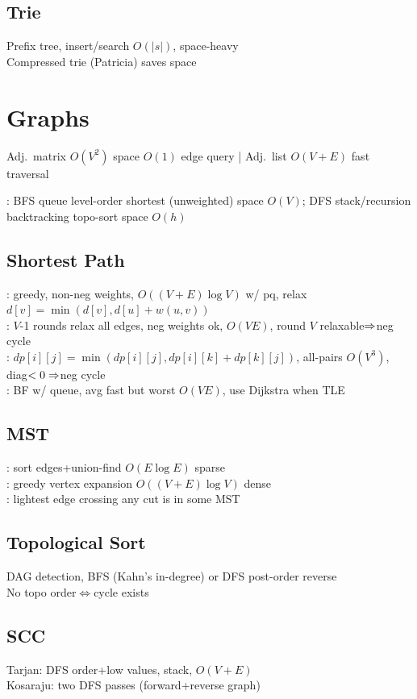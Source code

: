 \documentclass[lang=en,cols=5,paper=a4,fontsize=6pt,scheme=classic]{../cheatsheet}
\begin{document}
\subsection{Trie}
Prefix tree, insert/search $O(|s|)$, space-heavy\\
Compressed trie (Patricia) saves space

\section{Graphs}
Adj.\ matrix $O(V^2)$ space $O(1)$ edge query | Adj.\ list $O(V+E)$ fast traversal

: BFS queue level-order shortest (unweighted) space $O(V)$; DFS stack/recursion backtracking topo-sort space $O(h)$

\subsection{Shortest Path}
: greedy, non-neg weights, $O((V+E)\log V)$ w/ pq, relax $d[v]=\min(d[v],d[u]+w(u,v))$\\
: $V$-1 rounds relax all edges, neg weights ok, $O(VE)$, round $V$ relaxable$\Rightarrow$neg cycle\\
: $dp[i][j]=\min(dp[i][j],dp[i][k]+dp[k][j])$, all-pairs $O(V^3)$, diag$<0\Rightarrow$neg cycle\\
: BF w/ queue, avg fast but worst $O(VE)$, use Dijkstra when TLE

\subsection{MST}
: sort edges+union-find $O(E\log E)$ sparse\\
: greedy vertex expansion $O((V+E)\log V)$ dense\\
: lightest edge crossing any cut is in some MST

\subsection{Topological Sort}
DAG detection, BFS (Kahn's in-degree) or DFS post-order reverse\\
No topo order$\iff$cycle exists

\subsection{SCC}
Tarjan: DFS order+low values, stack, $O(V+E)$\\
Kosaraju: two DFS passes (forward+reverse graph)
\end{document}
